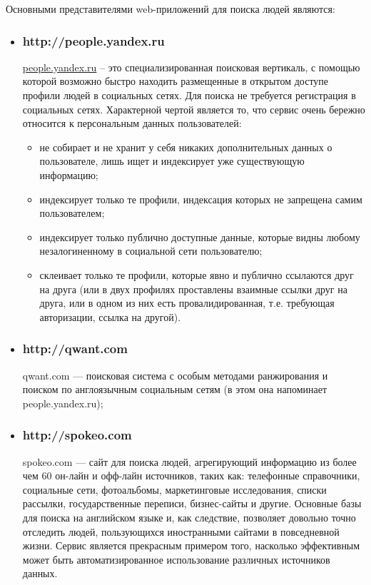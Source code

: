 \begin{itemize}
Основными представителями web-приложений для поиска людей являются:
	\begin{itemize}
\item \subsubsection{http://people.yandex.ru} %
\url{people.yandex.ru} – это специализированная поисковая вертикаль, с помощью которой возможно быстро находить размещенные в открытом доступе профили людей в социальных сетях. Для поиска не требуется регистрация в социальных сетях. Характерной чертой является то, что сервис очень бережно относится к персональным данных пользователей:
\begin{itemize}
\item не собирает и не хранит у себя никаких дополнительных данных о пользователе, лишь ищет и индексирует уже существующую информацию;
\item индексирует только те профили, индексация которых не запрещена самим пользователем;
\item индексирует только публично доступные данные, которые видны любому незалогиненному в социальной сети пользователю;
\item склеивает только те профили, которые явно и публично ссылаются друг на друга (или в двух профилях проставлены взаимные ссылки друг на друга, или в одном из них есть провалидированная, т.е. требующая авторизации, ссылка на другой).
\end{itemize}
\item \subsubsection{http://qwant.com}
qwant.com — поисковая система с особым методами ранжирования и поиском по англоязычным социальным сетям (в этом она напоминает people.yandex.ru);
\item \subsubsection{http://spokeo.com}
spokeo.com — сайт для поиска людей, агрегирующий информацию из более чем 60 он-лайн и офф-лайн источников, таких как: телефонные справочники, социальные сети, фотоальбомы, маркетинговые исследования, списки рассылки, государственные переписи, бизнес-сайты и другие. Основные базы для поиска на английском языке и, как следствие, позволяет довольно точно отследить людей, пользующихся иностранными сайтами в повседневной жизни. Сервис является прекрасным примером того, насколько эффективным может быть автоматизированное использование различных источников данных.
	\end{itemize}


\end{itemize}
